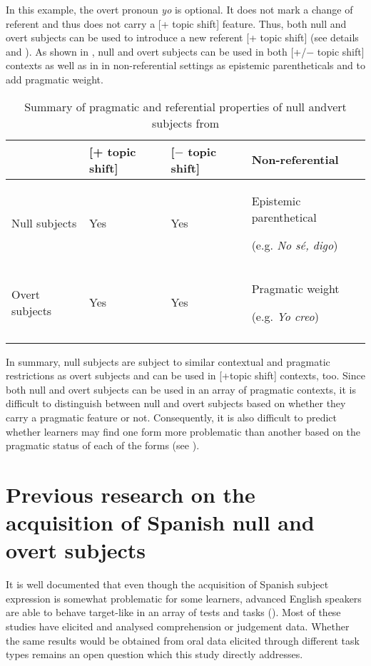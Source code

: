 \documentclass[output=paper]{langscibook}
\begin{document}
In this example, the overt pronoun \textit{yo} is optional. It does not mark a change of referent and thus does not carry a [+ topic shift] feature. Thus, both null and overt subjects can be used to introduce a new referent [+ topic shift] (see details \citealt{Dominguez2013} and \citealt{ClementsDomínguez2017}). As shown in , null and overt subjects can be used in both [+/$-$ topic shift] contexts as well as in in non-referential settings as epistemic parentheticals and to add pragmatic weight.


\begin{table}
\caption{\label{tab:dominguez:1} Summary of pragmatic and referential properties of null andvert subjects from \citep{Dominguez2013}}
\begin{tabularx}{\textwidth}{lllQ}
\lsptoprule
& [+ topic shift] & [$-$ topic shift] & Non-referential\\
\midrule
Null subjects & Yes & Yes & Epistemic parenthetical

(e.g. \textit{No sé, digo})\\
\tablevspace
Overt subjects & Yes & Yes & Pragmatic weight

(e.g. \textit{Yo creo})\\
\lspbottomrule
\end{tabularx}
\end{table}

In summary, null subjects are subject to similar contextual and pragmatic restrictions as overt subjects and can be used in [+topic shift] contexts, too. Since both null and overt subjects can be used in an array of pragmatic contexts, it is difficult to distinguish between null and overt subjects based on whether they carry a pragmatic feature or not. Consequently, it is also difficult to predict whether learners may find one form more problematic than another based on the pragmatic status of each of the forms (see \citealt{ClementsDomínguez2017}).

\section{Previous research on the acquisition of Spanish null and overt subjects}

It is well documented that even though the acquisition of Spanish subject expression is somewhat problematic for some learners, advanced English speakers are able to behave target-like in an array of tests and tasks (\citealt{Liceras1988,Phinney1987,Perez-LerouxGlass1999,LicerasDíaz1999,Lozano2002,Lozano2006,Hertel2003,Montrul2004,MontrulRodríguezLouro2006,BellettiEtAl2007,RothmanIverson2007,Dominguez2013,Pladevall2013,ClementsDomínguez2017}). Most of these studies have elicited and analysed comprehension or judgement data. Whether the same results would be obtained from oral data elicited through different task types remains an open question which this study directly addresses.
\end{document}
